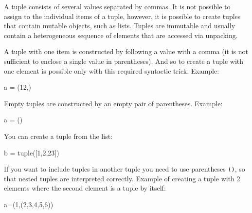 \documentclass[
]{article}
\newenvironment{Shaded}{}{}
\newcommand{\BuiltInTok}[1]{#1}
\newcommand{\DecValTok}[1]{\textcolor[rgb]{0.25,0.63,0.44}{#1}}
\newcommand{\NormalTok}[1]{#1}
\newcommand{\OperatorTok}[1]{\textcolor[rgb]{0.40,0.40,0.40}{#1}}
\begin{document}
A tuple consists of several values separated by commas. It is not
possible to assign to the individual items of a tuple, however, it is
possible to create tuples that contain mutable objects, such as lists.
Tuples are immutable and usually contain a heterogeneous sequence of
elements that are accessed via unpacking.

A tuple with one item is constructed by following a value with a comma
(it is not sufficient to enclose a single value in parentheses). And so
to create a tuple with one element is possible only with this required
syntactic trick. Example:

\begin{Shaded}
\begin{Highlighting}[]
\NormalTok{a }\OperatorTok{=}\NormalTok{ (}\DecValTok{12}\NormalTok{,)  }
\end{Highlighting}
\end{Shaded}

Empty tuples are constructed by an empty pair of parentheses. Example:

\begin{Shaded}
\begin{Highlighting}[]
\NormalTok{ a }\OperatorTok{=}\NormalTok{ ()}
\end{Highlighting}
\end{Shaded}

You can create a tuple from the list:

\begin{Shaded}
\begin{Highlighting}[]
\NormalTok{b }\OperatorTok{=} \BuiltInTok{tuple}\NormalTok{([}\DecValTok{1}\NormalTok{,}\DecValTok{2}\NormalTok{,}\DecValTok{23}\NormalTok{])}
\end{Highlighting}
\end{Shaded}

If you want to include tuples in another tuple you need to use
parentheses \texttt{()}, so that nested tuples are interpreted
correctly. Example of creating a tuple with 2 elements where the second
element is a tuple by itself:

\begin{Shaded}
\begin{Highlighting}[]
\NormalTok{a}\OperatorTok{=}\NormalTok{(}\DecValTok{1}\NormalTok{,(}\DecValTok{2}\NormalTok{,}\DecValTok{3}\NormalTok{,}\DecValTok{4}\NormalTok{,}\DecValTok{5}\NormalTok{,}\DecValTok{6}\NormalTok{))}
\end{Highlighting}
\end{Shaded}
\end{document}
